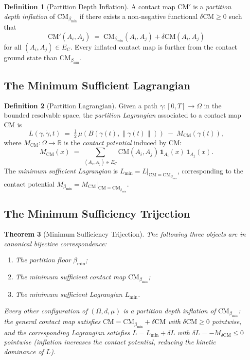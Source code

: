 \documentclass[12pt,a4paper,twocolumn]{article}
\theoremstyle{plain}
\newtheorem{theorem}{Theorem}[section]
\theoremstyle{definition}
\newtheorem{definition}[theorem]{Definition}
\theoremstyle{remark}
\newcommand{\CM}{\mathrm{CM}}
\newcommand{\bmin}{\beta_{\min}}
\newcommand{\Lmin}{L_{\min}}
\newcommand{\CMbmin}{\CM_{\bmin}}
\newcommand{\Real}{\mathbb{R}}
\newcommand{\BRS}{(\Omega,d,\mu)}
\begin{document}
\begin{definition}[Partition Depth Inflation]
\label{def:inflation}
A contact map $\CM'$ is a \emph{partition depth inflation} of $\CMbmin$ if
there exists a non-negative functional $\delta\CM \geq 0$ such that
\begin{equation}
  \CM'(A_i, A_j) \;=\; \CMbmin(A_i, A_j) + \delta\CM(A_i, A_j)
\end{equation}
for all $(A_i, A_j) \in E_C$.  Every inflated contact map is further from
the contact ground state than $\CMbmin$.
\end{definition}

\subsection{The Minimum Sufficient Lagrangian}

\begin{definition}[Partition Lagrangian]
\label{def:lagrangian}
Given a path $\gamma : [0,T] \to \Omega$ in the bounded resolvable space,
the \emph{partition Lagrangian} associated to a contact map $\CM$ is
\begin{equation}
  L(\gamma, \dot\gamma, t) \;=\; \tfrac{1}{2}\,\mu\!\left(B(\gamma(t), \|\dot\gamma(t)\|)\right)
    \;-\; M_\CM(\gamma(t)),
\end{equation}
where $M_\CM : \Omega \to \Real$ is the \emph{contact potential} induced by
$\CM$:
\begin{equation}
  M_\CM(x) \;=\; \sum_{(A_i,A_j) \in E_C} \CM(A_i,A_j)\,
    \mathbf{1}_{A_i}(x)\,\mathbf{1}_{A_j}(x).
\end{equation}
The \emph{minimum sufficient Lagrangian} is $\Lmin = L|_{\CM = \CMbmin}$,
corresponding to the contact potential $M_{\bmin} = M_\CM|_{\CM = \CMbmin}$.
\end{definition}

\subsection{The Minimum Sufficiency Trijection}

\begin{theorem}[Minimum Sufficiency Trijection]
\label{thm:minimum-sufficiency}
The following three objects are in canonical bijective correspondence:
\begin{enumerate}[label=(\Roman*)]
  \item The partition floor $\bmin$;
  \item The minimum sufficient contact map $\CMbmin$;
  \item The minimum sufficient Lagrangian $\Lmin$.
\end{enumerate}
Every other configuration of $\BRS$ is a partition depth inflation of
$\CMbmin$: the general contact map satisfies $\CM = \CMbmin + \delta\CM$
with $\delta\CM \geq 0$ pointwise, and the corresponding Lagrangian satisfies
$L = \Lmin + \delta L$ with $\delta L = -M_{\delta\CM} \leq 0$ pointwise
(inflation increases the contact potential, reducing the kinetic dominance
of $L$).
\end{theorem}
\end{document}
